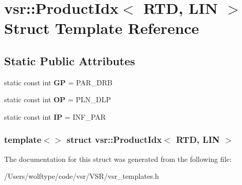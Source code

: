 \hypertarget{structvsr_1_1_product_idx_3_01_r_t_d_00_01_l_i_n_01_4}{\section{vsr\-:\-:Product\-Idx$<$ R\-T\-D, L\-I\-N $>$ Struct Template Reference}
\label{structvsr_1_1_product_idx_3_01_r_t_d_00_01_l_i_n_01_4}
}
\subsection*{Static Public Attributes}
\begin{DoxyCompactItemize}
\item 
\hypertarget{structvsr_1_1_product_idx_3_01_r_t_d_00_01_l_i_n_01_4_a4132b59be24da0a9922d71d1b82ad5f7}{static const int {\bfseries G\-P} = P\-A\-R\-\_\-\-D\-R\-B}\label{structvsr_1_1_product_idx_3_01_r_t_d_00_01_l_i_n_01_4_a4132b59be24da0a9922d71d1b82ad5f7}

\item 
\hypertarget{structvsr_1_1_product_idx_3_01_r_t_d_00_01_l_i_n_01_4_a18cbda38579dd9508f60e020ebff3b3f}{static const int {\bfseries O\-P} = P\-L\-N\-\_\-\-D\-L\-P}\label{structvsr_1_1_product_idx_3_01_r_t_d_00_01_l_i_n_01_4_a18cbda38579dd9508f60e020ebff3b3f}

\item 
\hypertarget{structvsr_1_1_product_idx_3_01_r_t_d_00_01_l_i_n_01_4_a8f591ebd471d15f6561c38ec5a3b9d46}{static const int {\bfseries I\-P} = I\-N\-F\-\_\-\-P\-A\-R}\label{structvsr_1_1_product_idx_3_01_r_t_d_00_01_l_i_n_01_4_a8f591ebd471d15f6561c38ec5a3b9d46}

\end{DoxyCompactItemize}
\subsubsection*{template$<$$>$ struct vsr\-::\-Product\-Idx$<$ R\-T\-D, L\-I\-N $>$}



The documentation for this struct was generated from the following file\-:\begin{DoxyCompactItemize}
\item 
/\-Users/wolftype/code/vsr/\-V\-S\-R/vsr\-\_\-templates.\-h\end{DoxyCompactItemize}
